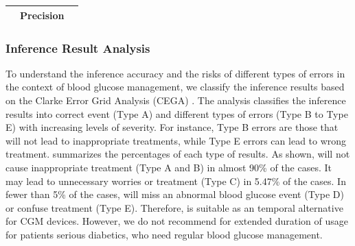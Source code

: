 \begin{table}[h]
\begin{tabular}{|c|c|c|c|c|l|l|}
\multicolumn{1}{|l|}{}                                                           & \multicolumn{4}{c|}{\textbf{Precision}}                                                                                 & \multicolumn{2}{l|}{}                                                                             \\ \hline
\end{tabular}
\end{table}


\subsubsection{Inference Result Analysis}
\label{subsec:predict_result_analysis}
To understand the inference accuracy and the risks of different types of errors in the context of blood glucose management, we classify the inference results based on the Clarke Error Grid Analysis (CEGA) \cite{bib:DTT05:Clarke}.
The analysis classifies the inference results into correct event (Type A) and different types of errors (Type B to Type E) with increasing levels of severity.
For instance, Type B errors are those that will not lead to inappropriate treatments, while Type E errors can lead to wrong treatment.
 summarizes the percentages of each type of results.
As shown, \sysname will not cause inappropriate treatment (Type A and B) in almost 90\% of the cases.
It may lead to unnecessary worries or treatment (Type C) in 5.47\% of the cases.
In fewer than 5\% of the cases, \sysname will miss an abnormal blood glucose event (Type D) or confuse treatment (Type E).
Therefore, \sysname is suitable as an temporal alternative for CGM devices.
However, we do not recommend \sysname for extended duration of usage for patients serious diabetics, who need regular blood glucose management.

